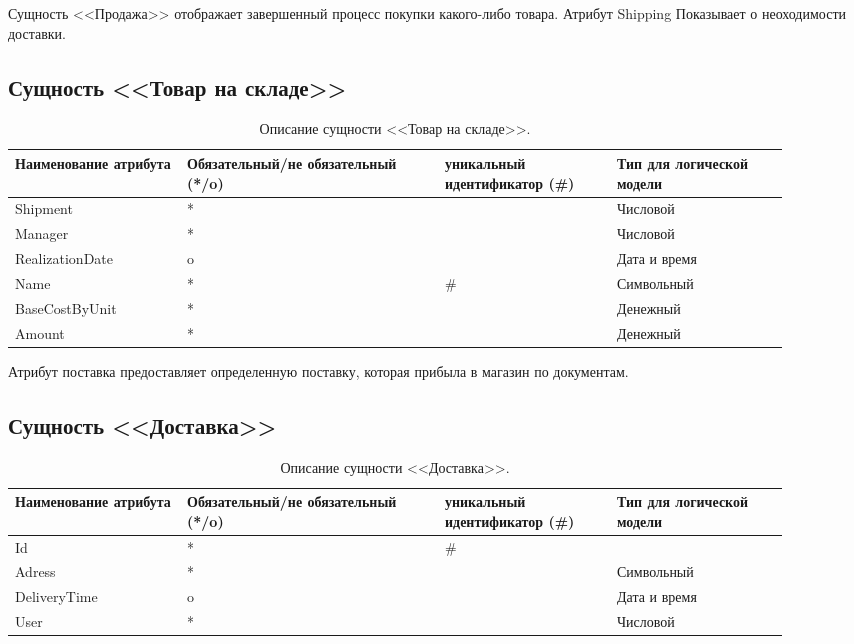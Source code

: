 \documentclass[14pt]{extreport}
\begin{document}
        Сущность <<Продажа>> отображает завершенный процесс покупки какого-либо товара. Атрибут Shipping Показывает о неоходимости доставки.
    
    \subsection*{Сущность <<Товар на складе>>}

        \begin{table}[H]
            \begin{tabular}{|p{0.2\linewidth}|p{0.3\linewidth}|p{0.2\linewidth}|p{0.2\linewidth}|}
                \hline
                Наименование атрибута & Обязательный/не обязательный (*/o) & уникальный идентификатор (\#) & Тип для логической модели
                \\ \hline
                Shipment & * & & Числовой\\ \hline
                Manager & * & & Числовой\\ \hline
                RealizationDate & o & & Дата и время \\ \hline
                Name & * & \# & Символьный  \\ \hline
                BaseCostByUnit & * & & Денежный \\ \hline
                Amount & * & & Денежный \\ \hline 
            \end{tabular}
            \caption{Описание сущности <<Товар на складе>>.}
        \end{table}

        Атрибут поставка предоставляет определенную поставку, которая прибыла в магазин по документам.
    
    \subsection*{Сущность <<Доставка>>}

        \begin{table}[H]
            \begin{tabular}{|p{0.2\linewidth}|p{0.3\linewidth}|p{0.2\linewidth}|p{0.2\linewidth}|}
                \hline
                Наименование атрибута & Обязательный/не обязательный (*/o) & уникальный идентификатор (\#) & Тип для логической модели
                \\ \hline
                Id & * & \# & \\ \hline
                Adress & * & & Символьный\\ \hline
                DeliveryTime & o & & Дата и время \\ \hline
                User & * &  & Числовой  \\ \hline
            \end{tabular}
            \caption{Описание сущности <<Доставка>>.}
        \end{table}
\end{document}
